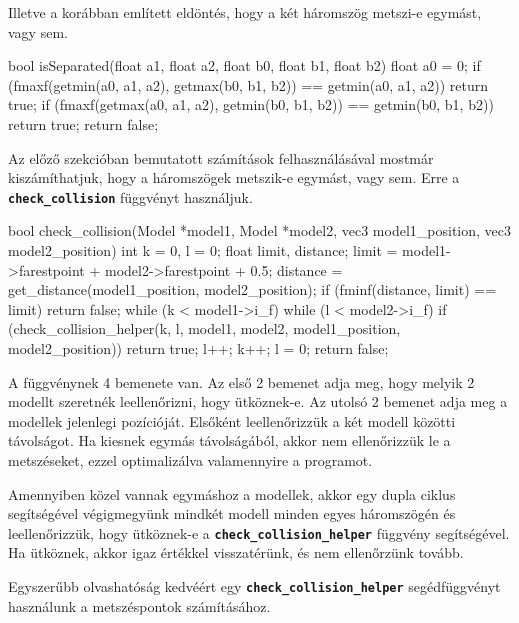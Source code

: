 Illetve a korábban említett eldöntés, hogy a két háromszög metszi-e egymást, vagy sem.

\begin{cpp}
bool isSeparated(float a1, float a2, float b0, float b1, float b2)
{
    float a0 = 0;
    if (fmaxf(getmin(a0, a1, a2), getmax(b0, b1, b2)) 
    == getmin(a0, a1, a2))
    {
        return true;
    }
    if (fmaxf(getmax(a0, a1, a2), getmin(b0, b1, b2)) 
    == getmin(b0, b1, b2))
    {
        return true;
    }
    return false;
}
\end{cpp}
\newpage
{}

Az előző szekcióban bemutatott számítások felhasználásával mostmár kiszámíthatjuk, hogy a háromszögek metszik-e egymást, vagy sem. Erre a \textbf{\texttt{check\_collision}} függvényt használjuk.

\begin{cpp}
bool check_collision(Model *model1, Model *model2, vec3 model1_position,
vec3 model2_position)
{
    int k = 0, l = 0;
    float limit, distance;
    limit = model1->farestpoint + model2->farestpoint + 0.5;
    distance = get_distance(model1_position, model2_position);
    if (fminf(distance, limit) == limit)
    {
        return false;
    }
    while (k < model1->i_f)
    {
        while (l < model2->i_f)
        {
            if (check_collision_helper(k, l, model1, model2, 
            model1_position, model2_position))
            {
                return true;
            }
            l++;
        }
        k++;
        l = 0;
    }
return false;
}
\end{cpp}

A függvénynek 4 bemenete van. Az első 2 bemenet adja meg, hogy melyik 2 modellt szeretnék leellenőrizni, hogy ütköznek-e. Az utolsó 2 bemenet adja meg a modellek jelenlegi pozícióját.
Elsőként leellenőrizzük a két modell közötti távolságot. Ha kiesnek egymás távolságából, akkor nem ellenőrizzük le a metszéseket, ezzel optimalizálva valamennyire a programot. 

Amennyiben közel vannak egymáshoz a modellek, akkor egy dupla ciklus segítségével végigmegyünk mindkét modell minden egyes háromszögén és leellenőrizzük, hogy ütköznek-e a \textbf{\texttt{check\_collision\_helper}} függvény segítségével. Ha ütköznek, akkor igaz értékkel visszatérünk, és nem ellenőrzünk tovább.
\newpage

Egyszerűbb olvashatóság kedvéért egy \textbf{\texttt{check\_collision\_helper}} segédfüggvényt használunk a metszéspontok számításához.

